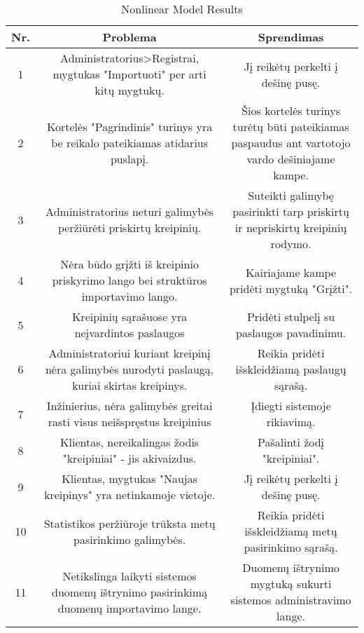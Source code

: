 		\begin{table}[ht] 
		\caption{Nonlinear Model Results} %
		\centering %
			\begin{tabular}{c c c} %
		\hline\hline %
		Nr. & Problema & Sprendimas\\ [0.5ex] %
		\hline %
		1 & Administratorius>Registrai, mygtukas "Importuoti" per arti kitų mygtukų. & Jį reikėtų perkelti į dešinę pusę.\\ %
		2 & Kortelės "Pagrindinis" turinys yra be reikalo pateikiamas atidarius puslapį. & Šios kortelės turinys turėtų būti pateikiamas paspaudus ant vartotojo vardo dešiniajame kampe.\\%
		3 & Administratorius neturi galimybės peržiūrėti priskirtų kreipinių. & Suteikti galimybę pasirinkti tarp priskirtų ir nepriskirtų kreipinių rodymo.\\ %
		4 & Nėra būdo grįžti iš kreipinio priskyrimo lango bei struktūros importavimo lango. & Kairiajame kampe pridėti mygtuką "Grįžti".\\ %
		5 & Kreipinių sąrašuose yra neįvardintos paslaugos & Pridėti stulpelį su paslaugos pavadinimu.\\%
		6 & Administratoriui kuriant kreipinį nėra galimybės nurodyti paslaugą, kuriai skirtas kreipinys. & Reikia pridėti išskleidžiamą paslaugų sąrašą.\\%
		7 & Inžinierius, nėra galimybės greitai rasti visus neišspręstus kreipinius & Įdiegti sistemoje rikiavimą.\\ %
		8 & Klientas, nereikalingas žodis "kreipiniai" - jis akivaizdus. & Pašalinti žodį "kreipiniai".\\%
		9 & Klientas, mygtukas "Naujas kreipinys" yra netinkamoje vietoje. & Jį reikėtų perkelti į dešinę pusę.\\%
		10 & Statistikos peržiūroje trūksta metų pasirinkimo galimybės. & Reikia pridėti išskleidžiamą metų pasirinkimo sąrašą.\\ %
		11 & Netikslinga laikyti sistemos duomenų ištrynimo pasirinkimą duomenų importavimo lange. & Duomenų ištrynimo mygtuką sukurti sistemos administravimo lange.\\%
		\hline %
		\end{tabular} 
		\label{table:nonlin} %
		\end{table} 
	
